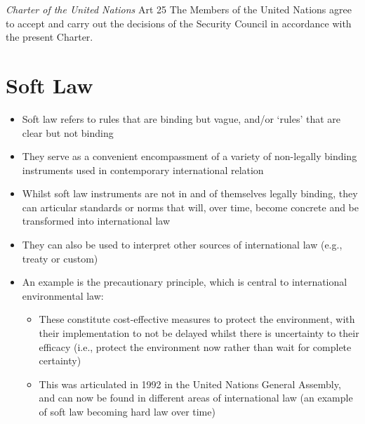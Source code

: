 \begin{conventiondetails}{\textit{Charter of the United Nations} Art 25}\label{UN Charter Art 25}
    \flushleft
    The Members of the United Nations agree to accept and carry out the decisions of the Security Council in accordance with the present Charter.
\end{conventiondetails}

\section{Soft Law}
\begin{itemize}
    \item Soft law refers to rules that are binding but vague, and/or `rules' that are clear but not binding
    \item They serve as a convenient encompassment of a variety of non-legally binding instruments used in contemporary international relation
    \item Whilst soft law instruments are not in and of themselves legally binding, they can articular standards or norms that will, over time, become concrete and be transformed into international law
    \item They can also be used to interpret other sources of international law (e.g., treaty or custom)
    \item An example is the precautionary principle, which is central to international environmental law:
    \begin{itemize}
        \item These constitute cost-effective measures to protect the environment, with their implementation to not be delayed whilst there is uncertainty to their efficacy (i.e., protect the environment now rather than wait for complete certainty)
        \item This was articulated in 1992 in the United Nations General Assembly, and can now be found in different areas of international law (an example of soft law becoming hard law over time)
    \end{itemize}
\end{itemize}